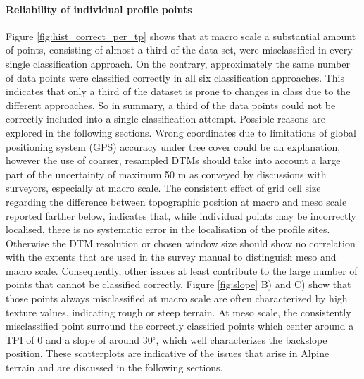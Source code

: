 \documentclass[preprint,12pt,authoryear]{elsarticle}
\begin{document}
\paragraph{Reliability of individual profile points} 
Figure \ref{fig:hist_correct_per_tp} shows that at macro scale a substantial amount of points, consisting of almost a third of the data set, were misclassified in every single classification approach. On the contrary, approximately the same number of data points were classified correctly in all six classification approaches. This indicates that only a third of the dataset is prone to changes in class due to the different approaches. So in summary, a third of the data points could not be correctly included into a single classification attempt. Possible reasons are explored in the following sections. Wrong coordinates due to limitations of global positioning system (GPS) accuracy under tree cover could be an explanation, however the use of coarser, resampled DTMs should take into account a large part of the uncertainty of maximum 50 m as conveyed by discussions with surveyors, especially at macro scale. The consistent effect of grid cell size regarding the difference between topographic position at macro and meso scale reported farther below, indicates that, while individual points may be incorrectly localised, there is no systematic error in the localisation of the profile sites. Otherwise the DTM resolution or chosen window size should show no correlation with the extents that are used in the survey manual to distinguish meso and macro scale. Consequently, other issues at least contribute to the large number of points that cannot be classified correctly. Figure \ref{fig:slope} B) and C) show that those points always misclassified at macro scale are often characterized by high texture values, indicating rough or steep terrain. At meso scale, the consistently misclassified point surround the correctly classified points which center around a TPI of 0 and a slope of around 30$^{\circ}$, which well characterizes the backslope position. These scatterplots are indicative of the issues that arise in Alpine terrain and are discussed in the following sections.
\end{document}
